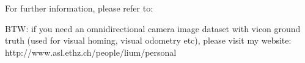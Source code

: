 \documentclass[a4paper, 11pt]{article}
\begin{document}
For further information, please refer to: \cite{liu12robio}

BTW: if you need an omnidirectional camera image dataset with vicon ground truth (used for visual homing, visual odometry etc), please visit my website:
http://www.asl.ethz.ch/people/lium/personal




\end{document}
